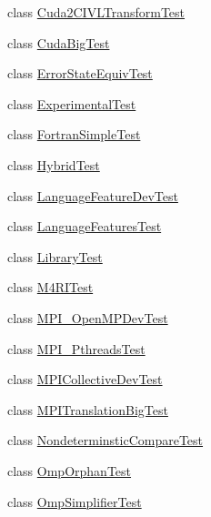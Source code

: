 \begin{DoxyCompactItemize}
\item 
class \hyperlink{classedu_1_1udel_1_1cis_1_1vsl_1_1civl_1_1Cuda2CIVLTransformTest}{Cuda2\+C\+I\+V\+L\+Transform\+Test}
\item 
class \hyperlink{classedu_1_1udel_1_1cis_1_1vsl_1_1civl_1_1CudaBigTest}{Cuda\+Big\+Test}
\item 
class \hyperlink{classedu_1_1udel_1_1cis_1_1vsl_1_1civl_1_1ErrorStateEquivTest}{Error\+State\+Equiv\+Test}
\item 
class \hyperlink{classedu_1_1udel_1_1cis_1_1vsl_1_1civl_1_1ExperimentalTest}{Experimental\+Test}
\item 
class \hyperlink{classedu_1_1udel_1_1cis_1_1vsl_1_1civl_1_1FortranSimpleTest}{Fortran\+Simple\+Test}
\item 
class \hyperlink{classedu_1_1udel_1_1cis_1_1vsl_1_1civl_1_1HybridTest}{Hybrid\+Test}
\item 
class \hyperlink{classedu_1_1udel_1_1cis_1_1vsl_1_1civl_1_1LanguageFeatureDevTest}{Language\+Feature\+Dev\+Test}
\item 
class \hyperlink{classedu_1_1udel_1_1cis_1_1vsl_1_1civl_1_1LanguageFeaturesTest}{Language\+Features\+Test}
\item 
class \hyperlink{classedu_1_1udel_1_1cis_1_1vsl_1_1civl_1_1LibraryTest}{Library\+Test}
\item 
class \hyperlink{classedu_1_1udel_1_1cis_1_1vsl_1_1civl_1_1M4RITest}{M4\+R\+I\+Test}
\item 
class \hyperlink{classedu_1_1udel_1_1cis_1_1vsl_1_1civl_1_1MPI__OpenMPDevTest}{M\+P\+I\+\_\+\+Open\+M\+P\+Dev\+Test}
\item 
class \hyperlink{classedu_1_1udel_1_1cis_1_1vsl_1_1civl_1_1MPI__PthreadsTest}{M\+P\+I\+\_\+\+Pthreads\+Test}
\item 
class \hyperlink{classedu_1_1udel_1_1cis_1_1vsl_1_1civl_1_1MPICollectiveDevTest}{M\+P\+I\+Collective\+Dev\+Test}
\item 
class \hyperlink{classedu_1_1udel_1_1cis_1_1vsl_1_1civl_1_1MPITranslationBigTest}{M\+P\+I\+Translation\+Big\+Test}
\item 
class \hyperlink{classedu_1_1udel_1_1cis_1_1vsl_1_1civl_1_1NondeterminsticCompareTest}{Nondeterminstic\+Compare\+Test}
\item 
class \hyperlink{classedu_1_1udel_1_1cis_1_1vsl_1_1civl_1_1OmpOrphanTest}{Omp\+Orphan\+Test}
\item 
class \hyperlink{classedu_1_1udel_1_1cis_1_1vsl_1_1civl_1_1OmpSimplifierTest}{Omp\+Simplifier\+Test}
\item 

\end{DoxyCompactItemize}
